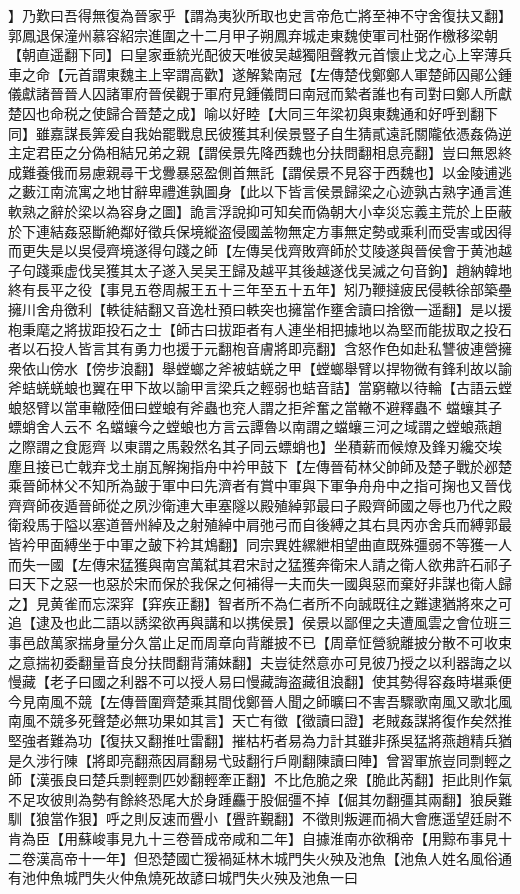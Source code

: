 】乃歎曰吾得無復為晉家乎【謂為夷狄所取也史言帝危亡將至神不守舍復扶又翻】郭鳳退保潼州慕容紹宗進圍之十二月甲子朔鳳弃城走東魏使軍司杜弼作檄移梁朝【朝直遥翻下同】曰皇家垂統光配彼天唯彼吴越獨阻聲教元首懷止戈之心上宰薄兵車之命【元首謂東魏主上宰謂高歡】遂解縶南冠【左傳楚伐鄭鄭人軍楚師囚鄖公鍾儀獻諸晉晉人囚諸軍府晉侯觀于軍府見鍾儀問曰南冠而縶者誰也有司對曰鄭人所獻楚囚也命税之使歸合晉楚之成】喻以好睦【大同三年梁初與東魏通和好呼到翻下同】雖嘉謀長筭爰自我始罷戰息民彼獲其利侯景豎子自生猜貳遠託關隴依憑姦偽逆主定君臣之分偽相結兄弟之親【謂侯景先降西魏也分扶問翻相息亮翻】豈曰無恩終成難養俄而易慮親尋干戈釁暴惡盈側首無託【謂侯景不見容于西魏也】以金陵逋逃之藪江南流寓之地甘辭卑禮進孰圖身【此以下皆言侯景歸梁之心迹孰古熟字通言進軟熟之辭於梁以為容身之圖】詭言浮說抑可知矣而偽朝大小幸災忘義主荒於上臣蔽於下連結姦惡斷絶鄰好徵兵保境縱盗侵國盖物無定方事無定勢或乘利而受害或因得而更失是以吳侵齊境遂得句踐之師【左傳吴伐齊敗齊師於艾陵遂與晉侯會于黄池越子句踐乘虚伐吴獲其太子遂入吴吴王歸及越平其後越遂伐吴滅之句音鉤】趙納韓地終有長平之役【事見五卷周赧王五十三年至五十五年】矧乃鞭撻疲民侵軼徐部築壘擁川舍舟徼利【軼徒結翻又音逸杜預曰軼突也擁當作壅舍讀曰捨徼一遥翻】是以援枹秉麾之將拔距投石之士【師古曰拔距者有人連坐相把據地以為堅而能拔取之投石者以石投人皆言其有勇力也援于元翻枹音膚將即亮翻】含怒作色如赴私讐彼連營擁衆依山傍水【傍步浪翻】舉螳螂之斧被蛣蜣之甲【螳螂舉臂以捍物微有鋒利故以諭斧蛣蜣蜣蜋也翼在甲下故以諭甲言梁兵之輕弱也蛣音詰】當窮轍以待輪【古語云螳蜋怒臂以當車轍陸佃曰螳蜋有斧蟲也兖人謂之拒斧奮之當轍不避釋蟲不蟷蠰其子螵蛸舍人云不名蟷蠰今之螳蜋也方言云譚魯以南謂之蟷蠰三河之域謂之螳蜋燕趙之際謂之食厖齊以東謂之馬穀然名其子同云螵蛸也】坐積薪而候燎及鋒刃纔交埃塵且接已亡戟弃戈土崩瓦解掬指舟中衿甲鼓下【左傳晉荀林父帥師及楚子戰於邲楚乘晉師林父不知所為皷于軍中曰先濟者有賞中軍與下軍争舟舟中之指可掬也又晉伐齊齊師夜遁晉師從之夙沙衛連大車塞隧以殿殖綽郭最曰子殿齊師國之辱也乃代之殿衛殺馬于隘以塞道晉州綽及之射殖綽中肩弛弓而自後縛之其右具丙亦舍兵而縛郭最皆衿甲面縛坐于中軍之皷下衿其鴆翻】同宗異姓縲紲相望曲直既殊彊弱不等獲一人而失一國【左傳宋猛獲與南宫萬弑其君宋討之猛獲奔衛宋人請之衛人欲弗許石祁子曰天下之惡一也惡於宋而保於我保之何補得一夫而失一國與惡而棄好非謀也衛人歸之】見黄雀而忘深穽【穽疾正翻】智者所不為仁者所不向誠既往之難逮猶將來之可追【逮及也此二語以誘梁欲再與講和以携侯景】侯景以鄙俚之夫遭風雲之會位班三事邑啟萬家揣身量分久當止足而周章向背離披不已【周章怔營貌離披分散不可收束之意揣初委翻量音良分扶問翻背蒲妹翻】夫豈徒然意亦可見彼乃授之以利器誨之以慢藏【老子曰國之利器不可以授人易曰慢藏誨盗藏徂浪翻】使其勢得容姦時堪乘便今見南風不競【左傳晉圍齊楚乘其間伐鄭晉人聞之師曠曰不害吾驟歌南風又歌北風南風不競多死聲楚必無功果如其言】天亡有徵【徵讀曰證】老賊姦謀將復作矣然推堅強者難為功【復扶又翻推吐雷翻】摧枯朽者易為力計其雖非孫吳猛將燕趙精兵猶是久涉行陳【將即亮翻燕因肩翻易弋䜴翻行戶剛翻陳讀曰陣】曾習軍旅豈同剽輕之師【漢張良曰楚兵剽輕剽匹妙翻輕牽正翻】不比危脆之衆【脆此芮翻】拒此則作氣不足攻彼則為勢有餘終恐尾大於身踵麤于股倔彊不掉【倔其勿翻彊其兩翻】狼戾難馴【狼當作狠】呼之則反速而舋小【舋許覲翻】不徵則叛遲而禍大會應遥望廷尉不肯為臣【用蘇峻事見九十三卷晉成帝咸和二年】自據淮南亦欲稱帝【用黥布事見十二卷漢高帝十一年】但恐楚國亡猨禍延林木城門失火殃及池魚【池魚人姓名風俗通有池仲魚城門失火仲魚燒死故諺曰城門失火殃及池魚一曰